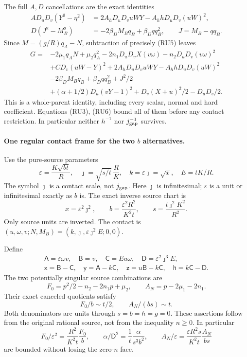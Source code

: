 The full $A,D$ cancellations are the exact identities
\[
\begin{aligned}
 AD_uD_v(Y^2-\eta^2)&=2A_hD_uD_vuWY-A_hhD_uD_v(uW)^2,\\
 D(J^2-M_B^2)&=-2\beta_DM_Bq_B+\beta_Dq q_B^2,
 \qquad J=M_B-q q_B.
\end{aligned}                                                     \tag{RU6}
\]
Since $M=(g/R)q_A-N$, subtraction of precisely (RU5) leaves
\[
\begin{aligned}
 G={}&-2\mu_1q_AN+\mu_2q_A^2
       -2n_1D_uD_vX(v\omega)-n_2D_uD_v(v\omega)^2\\
    &+CD_v(uW-Y)^2+2A_hD_uD_vuWY-A_hhD_uD_v(uW)^2\\
    &-2\beta_DM_Bq_B+\beta_Dq q_B^2+J^2/2\\
    &+(\alpha+1/2)D_u(vY-1)^2+D_v(X+u)^2/2-D_uD_v/2.
\end{aligned}                                                     \tag{RU7}
\]
This is a whole-parent identity, including every scalar, normal and
hard coefficient. Equations (RU3), (RU6) bound all of them before
any contact restriction. In particular neither $h^{-1}$ nor
$j_{\rm gap}^{-1}$ survives.

\paragraph{One regular contact frame for the two $b$ alternatives.}
Use the pure-source parameters
\[
 \varepsilon=\frac{K\sqrt{bt}}R,\quad
 \jmath=\sqrt{s/t}\,\frac RK,\quad k=\varepsilon\jmath=\sqrt x,
 \quad E=tK/R.
 \tag{RU8}
\]
The symbol $\jmath$ is a contact scale, not $j_{\rm gap}$.
Here $\jmath$ is infinitesimal; $\varepsilon$ is a unit or
infinitesimal exactly as $b$ is. The exact inverse source chart is
\[
 x=\varepsilon^2\jmath^2,\qquad
 b=\frac{\varepsilon^2R^2}{K^2t},\qquad
 s=\frac{t\jmath^2K^2}{R^2}.
 \tag{RU9}
\]
Only source units are inverted. The contact is
$(u,\omega,v;N,M_B)=(k,\jmath,\varepsilon\jmath^2E;0,0)$.

Define
\[
\begin{gathered}
 \mathsf A=\varepsilon\omega v,\quad\mathsf B=v,
 \quad\mathsf C=Eu\omega,\quad\mathsf D=\varepsilon^2\jmath^3E,\\
 \mathsf x=\mathsf B-\mathsf C,\quad
 \mathsf y=\mathsf A-k\mathsf C,\quad
 \mathsf z=u\mathsf B-k\mathsf C,\quad
 \mathsf h=k\mathsf C-\mathsf D.
\end{gathered}                                                     \tag{RU10}
\]
The two potentially singular source combinations are
\[
 F_0=p^2/2-n_2-2n_1p+\mu_2,\qquad A_N=p-2\mu_1-2n_1.
\]
Their exact canceled quotients satisfy
\[
 F_0/b\sim t/2,\qquad A_N/(bs)\sim t.
 \tag{RU11}
\]
Both denominators are units through $s=b=h=g=0$. These assertions
follow from the original rational source, not from the inequality
$n\ge0$. In particular
\[
 F_0/\varepsilon^2=\frac{R^2}{K^2t}\frac{F_0}b,
 \qquad \alpha/\mathsf D^2=\frac1t\frac\alpha{s^3b^2},
 \qquad A_N/\varepsilon=\frac{\varepsilon R^2s}{K^2t}
                               \frac{A_N}{bs}
 \tag{RU12}
\]
are bounded without losing the zero-$n$ face.

